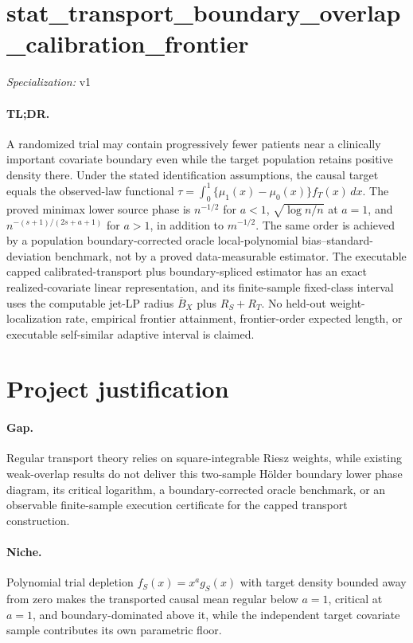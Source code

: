 \documentclass{article}
\begin{document}
\sloppy

\section*{stat\_\allowbreak{}transport\_\allowbreak{}boundary\_\allowbreak{}overlap\_\allowbreak{}calibration\_\allowbreak{}frontier}

\noindent\textit{Specialization:} v1\par

\paragraph{TL;DR.} A randomized trial may contain progressively fewer patients near a clinically important covariate boundary even while the target population retains positive density there. Under the stated identification assumptions, the causal target equals the observed-law functional \(\tau=\int_0^1\{\mu_1(x)-\mu_0(x)\}f_T(x)\,dx\). The proved minimax lower source phase is \(n^{-1/2}\) for \(a<1\), \(\sqrt{\log n/n}\) at \(a=1\), and \(n^{-(s+1)/(2s+a+1)}\) for \(a>1\), in addition to \(m^{-1/2}\). The same order is achieved by a population boundary-corrected oracle local-polynomial bias--standard-deviation benchmark, not by a proved data-measurable estimator. The executable capped calibrated-transport plus boundary-spliced estimator has an exact realized-covariate linear representation, and its finite-sample fixed-class interval uses the computable jet-LP radius \(\overline B_X\) plus \(R_S+R_T\). No held-out weight-localization rate, empirical frontier attainment, frontier-order expected length, or executable self-similar adaptive interval is claimed.

\section{Project justification}

\paragraph{Gap.} Regular transport theory relies on square-integrable Riesz weights, while existing weak-overlap results do not deliver this two-sample Hölder boundary lower phase diagram, its critical logarithm, a boundary-corrected oracle benchmark, or an observable finite-sample execution certificate for the capped transport construction.

\paragraph{Niche.} Polynomial trial depletion \(f_S(x)=x^ag_S(x)\) with target density bounded away from zero makes the transported causal mean regular below \(a=1\), critical at \(a=1\), and boundary-dominated above it, while the independent target covariate sample contributes its own parametric floor.
\end{document}
